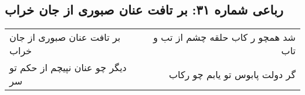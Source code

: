 \begin{center}
\section*{رباعی شماره ۳۱: بر تافت عنان صبوری از جان خراب}
\label{sec:sh031}
\begin{longtable}{l p{0.5cm} r}
بر تافت عنان صبوری از جان خراب
&&
شد همچو ر کاب حلقه چشم از تب و تاب
\\
دیگر چو عنان نپیچم از حکم تو سر
&&
گر دولت پابوس تو یابم چو رکاب
\\
\end{longtable}
\end{center}

